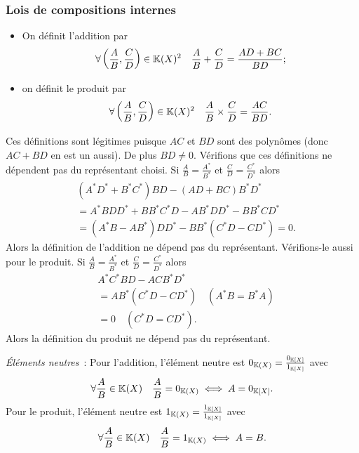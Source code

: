\subsubsection{Lois de compositions internes}
\begin{itemize}
\item On définit l'addition par
  \begin{equation}
    \forall \left(\frac{A}{B}, \frac{C}{D} \right) \in \mathbb{K}(X)^2 \quad \frac{A}{B}+\frac{C}{D} = \frac{AD+BC}{BD};
  \end{equation}
\item on définit le produit par
\begin{equation}
    \forall \left(\frac{A}{B}, \frac{C}{D} \right) \in \mathbb{K}(X)^2 \quad \frac{A}{B} \times \frac{C}{D} = \frac{AC}{BD}.
  \end{equation}
\end{itemize}
Ces définitions sont légitimes puisque $AC$ et $BD$ sont des polynômes (donc $AC+BD$ en est un aussi). De plus $BD \neq 0$. Vérifions que ces définitions ne dépendent pas du représentant choisi. Si $\frac{A}{B}=\frac{A^{*}}{B^{*}}$ et $\frac{C}{D}=\frac{C^{*}}{D^{*}}$ alors
\begin{align}
  & (A^{*}D^{*}+B^{*}C^{*})BD - (AD+BC)B^{*}D^{*} \\
  &= A^{*}BDD^{*}+BB^{*}C^{*}D-AB^{*}DD^{*}-BB^{*}CD^{*} \\
  &=(A^{*}B-AB^{*})DD^{*} - BB^{*}(C^{*}D-CD^{*}) =0.
\end{align}
Alors la définition de l'addition ne dépend pas du représentant. Vérifions-le aussi pour le produit. Si $\frac{A}{B}=\frac{A^{*}}{B^{*}}$ et $\frac{C}{D}=\frac{C^{*}}{D^{*}}$ alors
\begin{align}
  & A^{*}C^{*}BD-ACB^{*}D^{*} \\
  &= AB^{*}(C^{*}D-CD^{*}) \quad (A^{*}B=B^{*}A) \\
  &=0 \quad (C^{*}D=CD^{*}).
\end{align}
Alors la définition du produit ne dépend pas du représentant.

\emph{Éléments neutres}~: Pour l'addition, l'élément neutre est $0_{\mathbb{K}(X)}=\frac{0_{\mathbb{K}[X]}}{1_{\mathbb{K}[X]}}$ avec
\begin{equation}
  \forall \frac{A}{B} \in \mathbb{K}(X) \quad \frac{A}{B} = 0_{\mathbb{K}(X)} \iff A = 0_{\mathbb{K}[X]}.
\end{equation}
Pour le produit, l'élément neutre est $1_{\mathbb{K}(X)}=\frac{1_{\mathbb{K}[X]}}{1_{\mathbb{K}[X]}}$ avec
\begin{equation}
  \forall \frac{A}{B} \in \mathbb{K}(X) \quad \frac{A}{B} = 1_{\mathbb{K}(X)} \iff A = B.
\end{equation}

